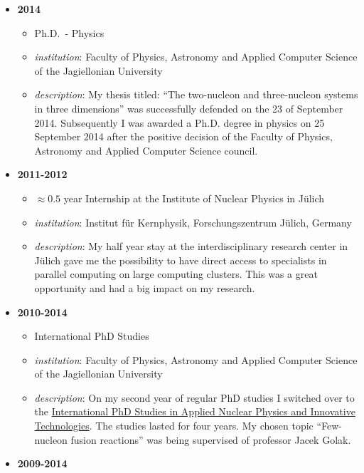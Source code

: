 \documentclass{article}
\providecommand{\tightlist}{%
  \setlength{\itemsep}{0pt}\setlength{\parskip}{0pt}}
\begin{document}
\begin{itemize}
\tightlist
\item
  \textbf{2014}

  \begin{itemize}
  \tightlist
  \item
    Ph.D.~- Physics
  \item
    \emph{institution}: Faculty of Physics, Astronomy and Applied
    Computer Science of the Jagiellonian University
  \item
    \emph{description}: My thesis titled: ``The two-nucleon and
    three-nucleon systems in three dimensions'' was successfully
    defended on the 23 of September 2014. Subsequently I was awarded a
    Ph.D. degree in physics on 25 September 2014 after the positive
    decision of the Faculty of Physics, Astronomy and Applied Computer
    Science council.
  \end{itemize}
\item
  \textbf{2011-2012}

  \begin{itemize}
  \tightlist
  \item
    \(\approx 0.5\) year Internship at the Institute of Nuclear Physics
    in Jülich
  \item
    \emph{institution}: Institut für Kernphysik, Forschungszentrum
    Jülich, Germany
  \item
    \emph{description}: My half year stay at the interdisciplinary
    research center in Jülich gave me the possibility to have direct
    access to specialists in parallel computing on large computing
    clusters. This was a great opportunity and had a big impact on my
    research.
  \end{itemize}
\item
  \textbf{2010-2014}

  \begin{itemize}
  \tightlist
  \item
    International PhD Studies
  \item
    \emph{institution}: Faculty of Physics, Astronomy and Applied
    Computer Science of the Jagiellonian University
  \item
    \emph{description}: On my second year of regular PhD studies I
    switched over to the
    \href{https://fais.uj.edu.pl/applied-nuclear-physics-and-innovative-technologies}{International
    PhD Studies in Applied Nuclear Physics and Innovative Technologies}.
    The studies lasted for four years. My chosen topic ``Few-nucleon
    fusion reactions'' was being supervised of professor Jacek Golak.
  \end{itemize}
\item
  \textbf{2009-2014}


\end{itemize}
\end{document}
